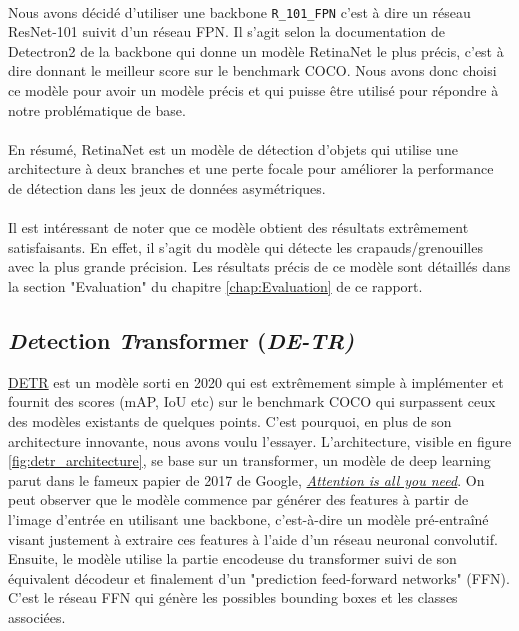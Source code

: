 \paragraph{} Nous avons décidé d'utiliser une backbone \verb|R_101_FPN| c'est à dire un réseau ResNet-101 suivit d'un réseau FPN. Il s'agit selon la documentation de Detectron2 de la backbone qui donne un modèle RetinaNet le plus précis, c'est à dire donnant le meilleur score sur le benchmark COCO. Nous avons donc choisi ce modèle pour avoir un modèle précis et qui puisse être utilisé pour répondre à notre problématique de base.

\paragraph{} En résumé, RetinaNet est un modèle de détection d'objets qui utilise une architecture à deux branches et une perte focale pour améliorer la performance de détection dans les jeux de données asymétriques.


\paragraph{} Il est intéressant de noter que ce modèle obtient des résultats extrêmement satisfaisants. En effet, il s'agit du modèle qui détecte les crapauds/grenouilles avec la plus grande précision. Les résultats précis de ce modèle sont détaillés dans la section "Evaluation" du chapitre \ref{chap:Evaluation} de ce rapport.

\subsection{\textit{De}tection \textit{Tr}ansformer (\textit{DE-TR)}}

\href{https://github.com/facebookresearch/detr}{DETR} est un modèle sorti en 2020 qui est extrêmement simple à implémenter et fournit des scores (mAP, IoU etc) sur le benchmark COCO qui surpassent ceux des modèles existants de quelques points. C’est pourquoi, en plus de son architecture innovante, nous avons voulu l’essayer. L’architecture, visible en figure \ref{fig:detr_architecture}, se base sur un transformer, un modèle de deep learning parut dans le fameux papier de 2017 de Google, \href{https://arxiv.org/pdf/1706.03762.pdf}{\textit{Attention is all you need}}. On peut observer que le modèle commence par générer des features à partir de l'image d'entrée en utilisant une backbone, c'est-à-dire un modèle pré-entraîné visant justement à extraire ces features à l'aide d'un réseau neuronal convolutif. Ensuite, le modèle utilise la partie encodeuse du transformer suivi de son équivalent décodeur et finalement d'un "prediction feed-forward networks" (FFN). C'est le réseau FFN qui génère les possibles bounding boxes et les classes associées.

